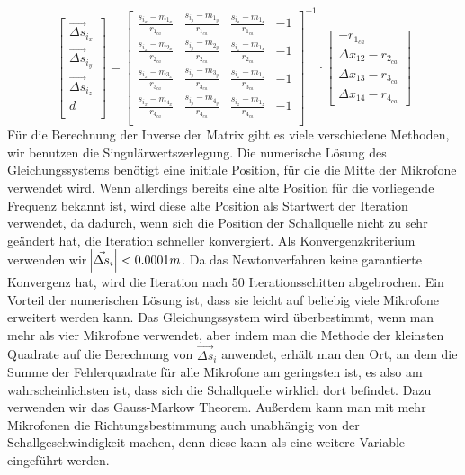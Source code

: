 $$
\begin{bmatrix}
\vec{\Delta{s}}_{i_x} \\
\vec{\Delta{s}}_{i_y} \\
\vec{\Delta{s}}_{i_z} \\
                d \\
\end{bmatrix}
=
{\begin{bmatrix}
\frac{s_{i_x} - m_{1_x}}{r_{1_{ca}}} & \frac{s_{i_y} - m_{1_y}}{r_{1_{ca}}} & \frac{s_{i_z} - m_{1_z}}{r_{1_{ca}}} & -1 \\
\frac{s_{i_x} - m_{2_x}}{r_{2_{ca}}} & \frac{s_{i_y} - m_{2_y}}{r_{2_{ca}}} & \frac{s_{i_z} - m_{1_z}}{r_{2_{ca}}} & -1 \\
\frac{s_{i_x} - m_{3_x}}{r_{3_{ca}}} & \frac{s_{i_y} - m_{3_y}}{r_{3_{ca}}} & \frac{s_{i_z} - m_{1_z}}{r_{3_{ca}}} & -1 \\
\frac{s_{i_x} - m_{4_x}}{r_{4_{ca}}} & \frac{s_{i_y} - m_{4_y}}{r_{4_{ca}}} & \frac{s_{i_z} - m_{1_z}}{r_{4_{ca}}} & -1 \\
\end{bmatrix}}^{-1}
\cdot
\begin{bmatrix}
-r_{1_{ca}}\\
\Delta{x_{12}} - r_{2_{ca}}\\
\Delta{x_{13}} - r_{3_{ca}}\\
\Delta{x_{14}} - r_{4_{ca}}
\end{bmatrix}
$$
Für die Berechnung der Inverse der Matrix gibt es viele verschiedene Methoden, wir benutzen die Singulärwertszerlegung. Die numerische Lösung des Gleichungssystems benötigt eine initiale Position, für die die Mitte der Mikrofone verwendet wird. Wenn allerdings bereits eine alte Position für die vorliegende Frequenz bekannt ist, wird diese alte Position als Startwert der Iteration verwendet, da dadurch, wenn sich die Position der Schallquelle nicht zu sehr geändert hat, die Iteration schneller konvergiert. Als Konvergenzkriterium verwenden wir $\abs{\vec{\Delta{s}}_i} < 0.0001m$. Da das Newtonverfahren keine garantierte Konvergenz hat, wird die Iteration nach $50$ Iterationsschitten abgebrochen.
Ein Vorteil der numerischen Lösung ist, dass sie leicht auf beliebig viele Mikrofone erweitert werden kann. Das Gleichungssystem wird überbestimmt, wenn man mehr als vier Mikrofone verwendet, aber indem man die Methode der kleinsten Quadrate auf die Berechnung von $\vec{\Delta{s}}_i$ anwendet, erhält man den Ort, an dem die Summe der Fehlerquadrate für alle Mikrofone am geringsten ist, es also am wahrscheinlichsten ist, dass sich die Schallquelle wirklich dort befindet. Dazu verwenden wir das Gauss-Markow Theorem. Außerdem kann man mit mehr Mikrofonen die Richtungsbestimmung auch unabhängig von der Schallgeschwindigkeit machen, denn diese kann als eine weitere Variable eingeführt werden.
